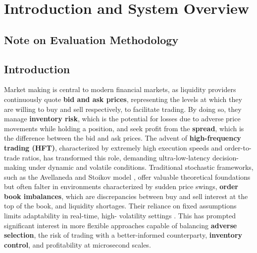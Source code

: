 \chapter{Introduction and System Overview}

\section*{Note on Evaluation Methodology}
\datamethodology

\section{Introduction}
Market making is central to modern financial markets, as liquidity providers continuously quote \textbf{bid and ask prices}, representing the levels at which they are willing to buy and sell respectively, to facilitate trading. By doing so, they manage \textbf{inventory risk}, which is the potential for losses due to adverse price movements while holding a position, and seek profit from the \textbf{spread}, which is the difference between the bid and ask prices. The advent of \textbf{high-frequency trading (HFT)}, characterized by extremely high execution speeds and order-to-trade ratios, has transformed this role, demanding ultra-low-latency decision-making under dynamic and volatile conditions. Traditional stochastic frameworks, such as the Avellaneda and Stoikov model \citep{Avellaneda2008}, offer valuable theoretical foundations but often falter in environments characterized by sudden price swings, \textbf{order book imbalances}, which are discrepancies between buy and sell interest at the top of the book, and liquidity shortages. 
 Their reliance on fixed assumptions limits adaptability in real-time, high-
 volatility settings \citep{Patel2022,Su2025,Avellaneda2008}. This has prompted significant interest in more flexible approaches capable of balancing \textbf{adverse selection}, the risk of trading with a better-informed counterparty, \textbf{inventory control}, and profitability at microsecond scales. 
 
